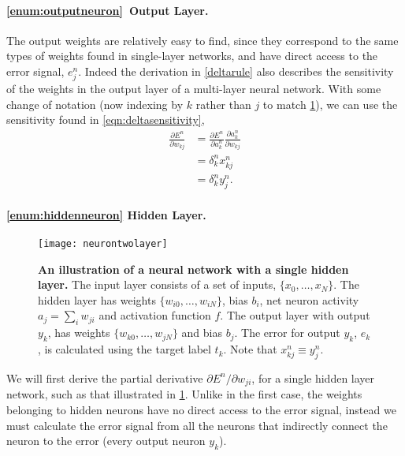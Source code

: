 \documentclass[thesis]{subfiles}
\begin{document}
\paragraph{\ref{enum:outputneuron}~Output Layer.}
The output weights are relatively easy to find, since they correspond to the same types of weights found in single-layer networks, and have direct access to the error signal, \ie$e^n_j$. Indeed the derivation in \cref{deltarule} also describes the sensitivity of the weights in the output layer of a multi-layer neural network. With some change of notation (now indexing by $k$ rather than $j$ to match \cref{fig:neurontwolayer}), we can use the sensitivity found in \cref{eqn:deltasensitivity},
%
\begin{equation}
\begin{aligned}
    \frac{\partial E^n}{\partial w_{kj}} &= \frac{\partial E^n}{\partial a^n_k} \frac{\partial a^n_k}{\partial w_{kj}}\\
    &= \delta^n_k x^n_{kj}\\
    &= \delta^n_k y^n_j.
\end{aligned}
\label{eqn:outputlayer}
\end{equation}
%
\paragraph{\ref{enum:hiddenneuron} Hidden Layer.}
\begin{figure}[tbp]
\centering
\texttt{[image: neurontwolayer]}
\caption[An illustration of a neural network with a single hidden layer]{\textbf{An illustration of a neural network with a single hidden layer.} The input layer consists of a set of inputs, $\{x_{0}, \ldots, x_{N}\}$. The hidden layer has weights $\{w_{i0}, \ldots, w_{iN}\}$, bias $b_i$, net neuron activity $a_j = \sum_i w_{ji}$ and activation function $f$. The output layer with output $y_k$, has weights $\{w_{k0}, \ldots, w_{jN}\}$ and bias $b_j$. The error for output $y_k$, $e_k$, is calculated using the target label $t_k$. Note that $x^n_{kj} \equiv y^n	_j$.}
\label{fig:neurontwolayer}
\end{figure}
We will first derive the partial derivative ${\partial E^n}/{\partial w_{ji}}$, for a single hidden layer network, such as that illustrated in \cref{fig:neurontwolayer}. Unlike in the first case, the weights belonging to hidden neurons have no direct access to the error signal, instead we must calculate the error signal from all the neurons that indirectly connect the neuron to the error (\ie{}every output neuron $y_k$).
\end{document}
